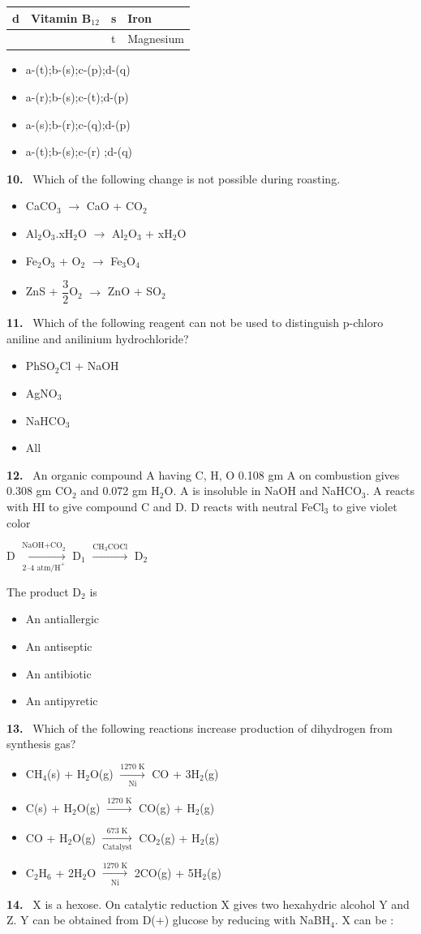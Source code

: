 \documentclass[10pt]{extarticle}
\newcommand{\qn}[1]{\par\smallskip\noindent\textbf{#1.}~}
\newenvironment{qoptions}{\begin{itemize}[leftmargin=1.8em,itemsep=1pt,topsep=2pt,label={}]}{\end{itemize}}
\newcommand{\opt}[2]{\item[(#1)] #2}
\begin{document}
\begin{multicols}{2}
{\begin{tabular}{|L{.4cm}|L{3cm}|L{.4cm}|L{2.4cm}|}
d & Vitamin B$_{12}$ & s & Iron \\ \hline
 & & t & Magnesium \\ \hline
\end{tabular}}\par
\begin{qoptions}
\opt{A}{a-(t);b-(s);c-(p);d-(q)}
\opt{B}{a-(r);b-(s);c-(t);d-(p)}
\opt{C}{a-(s);b-(r);c-(q);d-(p)}
\opt{D}{a-(t);b-(s);c-(r) ;d-(q)}
\end{qoptions}
\qn{10} Which of the following change is not possible during roasting.
\begin{qoptions}
\opt{A}{CaCO$_3$ $\longrightarrow$ CaO + CO$_2$}
\opt{B}{Al$_2$O$_3$.xH$_2$O $\longrightarrow$ Al$_2$O$_3$ + xH$_2$O}
\opt{C}{Fe$_2$O$_3$ + O$_2$ $\longrightarrow$ Fe$_3$O$_4$}
\opt{D}{ZnS + $\dfrac{3}{2}$O$_2$ $\longrightarrow$ ZnO + SO$_2$}
\end{qoptions}
\qn{11} Which of the following reagent can not be used to distinguish p-chloro aniline and anilinium hydrochloride?
\begin{qoptions}
\opt{A}{PhSO$_2$Cl + NaOH}
\opt{B}{AgNO$_3$}
\opt{C}{NaHCO$_3$}
\opt{D}{All}
\end{qoptions}
\qn{12} An organic compound A having C, H, O 0.108 gm A on combustion gives 0.308 gm CO$_2$ and 0.072 gm H$_2$O. A is insoluble in NaOH and NaHCO$_3$. A reacts with HI to give compound C and D. D reacts with neutral FeCl$_3$ to give violet color\par
\noindent D $\xrightarrow[\text{2--4 atm/H}^+]{\text{NaOH+CO}_2}$ D$_1$ $\xrightarrow{\text{CH}_3\text{COCl}}$ D$_2$\par
The product D$_2$ is
\begin{qoptions}
\opt{A}{An antiallergic}
\opt{B}{An antiseptic}
\opt{C}{An antibiotic}
\opt{D}{An antipyretic}
\end{qoptions}
\qn{13} Which of the following reactions increase production of dihydrogen from synthesis gas?
\begin{qoptions}
\opt{A}{CH$_4$(s) + H$_2$O(g) $\xrightarrow[\text{Ni}]{1270\text{ K}}$ CO + 3H$_2$(g)}
\opt{B}{C(s) + H$_2$O(g) $\xrightarrow{1270\text{ K}}$ CO(g) + H$_2$(g)}
\opt{C}{CO + H$_2$O(g) $\xrightarrow[\text{Catalyst}]{673\text{ K}}$ CO$_2$(g) + H$_2$(g)}
\opt{D}{C$_2$H$_6$ + 2H$_2$O $\xrightarrow[\text{Ni}]{1270\text{ K}}$ 2CO(g) + 5H$_2$(g)}
\end{qoptions}
\qn{14} X is a hexose. On catalytic reduction X gives two hexahydric alcohol Y and Z. Y can be obtained from D(+) glucose by reducing with NaBH$_4$. X can be :

\end{multicols}
\end{document}
